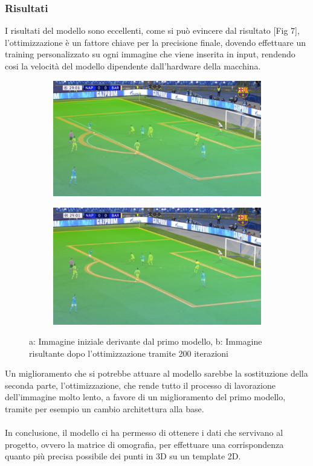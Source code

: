 \documentclass{article}
\begin{document}
\subsubsection{Risultati}

I risultati del modello sono eccellenti, come si può evincere dal risultato [Fig 7], l'ottimizzazione è un fattore chiave per la precisione finale, dovendo effettuare un training personalizzato su ogni immagine che viene inserita in input, rendendo cosi la velocità del modello dipendente dall'hardware della macchina. 


\begin{figure}[h]
    \centering
    \begin{subfigure}{0.45\textwidth}
        \includegraphics[width=\linewidth]{capitoli/HpitchSample.png}
        \subcaption{}
    \end{subfigure}
    \begin{subfigure}{0.45\textwidth}
        \includegraphics[width=\linewidth]{capitoli/HpitchOptimSample.png}
        \subcaption{}
    \end{subfigure}
    \caption{a: Immagine iniziale derivante dal primo modello, b: Immagine risultante dopo l'ottimizzazione tramite 200 iterazioni}
    \label{fig:foobar}
\end{figure}

 Un miglioramento che si potrebbe attuare al modello sarebbe la sostituzione della seconda parte, l'ottimizzazione, che rende tutto il processo di lavorazione dell'immagine molto lento, a favore di un miglioramento del primo modello, tramite per esempio un cambio architettura alla base. 
\\\\
 In conclusione, il modello ci ha permesso di ottenere i dati che servivano al progetto, ovvero la matrice di omografia, per effettuare una corrispondenza quanto più precisa possibile dei punti in 3D su un template 2D.
\end{document}
